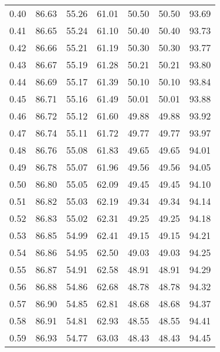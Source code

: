 \begin{tabular}{|c|c|c|c|c|c|c|}
      0.40 &     86.63 &     55.26 &      61.01 &   50.50 &      50.50 &         93.69 \\
      0.41 &     86.65 &     55.24 &      61.10 &   50.40 &      50.40 &         93.73 \\
      0.42 &     86.66 &     55.21 &      61.19 &   50.30 &      50.30 &         93.77 \\
      0.43 &     86.67 &     55.19 &      61.28 &   50.21 &      50.21 &         93.80 \\
      0.44 &     86.69 &     55.17 &      61.39 &   50.10 &      50.10 &         93.84 \\
      0.45 &     86.71 &     55.16 &      61.49 &   50.01 &      50.01 &         93.88 \\
      0.46 &     86.72 &     55.12 &      61.60 &   49.88 &      49.88 &         93.92 \\
      0.47 &     86.74 &     55.11 &      61.72 &   49.77 &      49.77 &         93.97 \\
      0.48 &     86.76 &     55.08 &      61.83 &   49.65 &      49.65 &         94.01 \\
      0.49 &     86.78 &     55.07 &      61.96 &   49.56 &      49.56 &         94.05 \\
      0.50 &     86.80 &     55.05 &      62.09 &   49.45 &      49.45 &         94.10 \\
      0.51 &     86.82 &     55.03 &      62.19 &   49.34 &      49.34 &         94.14 \\
      0.52 &     86.83 &     55.02 &      62.31 &   49.25 &      49.25 &         94.18 \\
      0.53 &     86.85 &     54.99 &      62.41 &   49.15 &      49.15 &         94.21 \\
      0.54 &     86.86 &     54.95 &      62.50 &   49.03 &      49.03 &         94.25 \\
      0.55 &     86.87 &     54.91 &      62.58 &   48.91 &      48.91 &         94.29 \\
      0.56 &     86.88 &     54.86 &      62.68 &   48.78 &      48.78 &         94.32 \\
      0.57 &     86.90 &     54.85 &      62.81 &   48.68 &      48.68 &         94.37 \\
      0.58 &     86.91 &     54.81 &      62.93 &   48.55 &      48.55 &         94.41 \\
      0.59 &     86.93 &     54.77 &      63.03 &   48.43 &      48.43 &         94.45 \\

\end{tabular}
